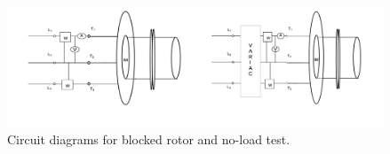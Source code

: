 \begin{figure}[htbp!]
    \centering
    \includegraphics[width=\linewidth]{images/output/ct.png}
    \caption{Circuit diagrams for blocked rotor and no-load test.}
    \label{fig:fig}
\end{figure}
\vspace{\fill}